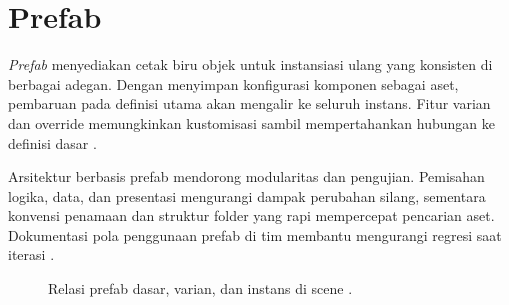 \documentclass[../main.tex]{subfiles}
\begin{document}
\section{Prefab}
\textit{Prefab} menyediakan cetak biru objek untuk instansiasi ulang yang konsisten di berbagai adegan. Dengan menyimpan konfigurasi komponen sebagai aset, pembaruan pada definisi utama akan mengalir ke seluruh instans. Fitur varian dan override memungkinkan kustomisasi sambil mempertahankan hubungan ke definisi dasar \parencite{unity-prefab}.

Arsitektur berbasis prefab mendorong modularitas dan pengujian. Pemisahan logika, data, dan presentasi mengurangi dampak perubahan silang, sementara konvensi penamaan dan struktur folder yang rapi mempercepat pencarian aset. Dokumentasi pola penggunaan prefab di tim membantu mengurangi regresi saat iterasi \parencite{unity-prefab,unity-project-structure}.

\begin{figure}[h]
  \centering
  \caption{Relasi prefab dasar, varian, dan instans di scene \parencite{unity-prefab}.}
\end{figure}

\onlyinsubfile{\printbibliography}
\end{document}
